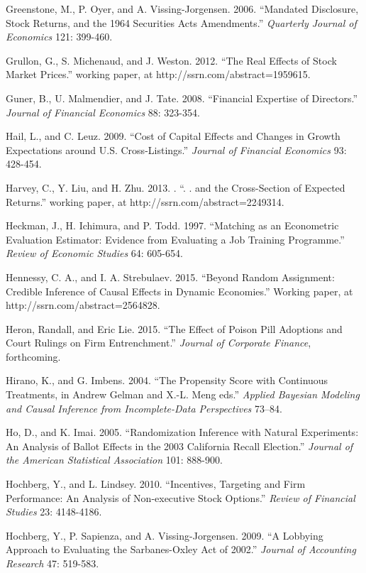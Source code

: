 \noindent Greenstone, M., P. Oyer, and A. Vissing-Jorgensen. 2006. ``Mandated Disclosure, Stock Returns, and the 1964 Securities Acts Amendments.'' \textit{ Quarterly Journal of Economics} 121: 399-460.

\noindent Grullon, G., S. Michenaud, and J. Weston. 2012. ``The Real Effects of Stock Market Prices.'' working paper, at http://ssrn.com/abstract=1959615.

\noindent Guner, B., U. Malmendier, and J. Tate. 2008. ``Financial Expertise of Directors.'' \textit{Journal of Financial Economics }88: 323-354.

\noindent Hail, L., and C. Leuz. 2009. ``Cost of Capital Effects and Changes in Growth Expectations around U.S. Cross-Listings.''  \textit{Journal of Financial Economics} 93: 428-454.

\noindent Harvey, C., Y. Liu, and H. Zhu. 2013. . ``. . and the Cross-Section of Expected Returns.'' working paper, at http://ssrn.com/abstract=2249314.

\noindent Heckman, J., H. Ichimura, and P. Todd. 1997. ``Matching as an Econometric Evaluation Estimator:  Evidence from Evaluating a Job Training Programme.''  \textit{Review of Economic Studies} 64: 605-654.

\noindent Hennessy, C. A., and I. A. Strebulaev.  2015.  ``Beyond Random Assignment:  Credible Inference of Causal Effects in Dynamic Economies.''  Working paper, at http://ssrn.com/abstract=2564828.

\noindent Heron, Randall, and Eric Lie.  2015.  ``The Effect of Poison Pill Adoptions and Court Rulings on Firm Entrenchment.''  \textit{Journal of Corporate Finance}, forthcoming.

\noindent Hirano, K., and G. Imbens. 2004. ``The Propensity Score with Continuous Treatments, in Andrew Gelman and X.-L. Meng eds.'' \textit{Applied Bayesian Modeling and Causal Inference from Incomplete-Data Perspectives }73--84.

\noindent Ho, D., and K. Imai. 2005. ``Randomization Inference with Natural Experiments:  An Analysis of Ballot Effects in the 2003 California Recall Election.'' \textit{Journal of the American Statistical Association} 101: 888-900.

\noindent Hochberg, Y., and L. Lindsey. 2010. ``Incentives, Targeting and Firm Performance:  An Analysis of Non-executive Stock Options.''  \textit{Review of Financial Studies} 23: 4148-4186.

\noindent Hochberg, Y., P. Sapienza, and A. Vissing-Jorgensen. 2009. ``A Lobbying Approach to Evaluating the Sarbanes-Oxley Act of 2002.''  \textit{Journal of Accounting Research} 47: 519-583.

